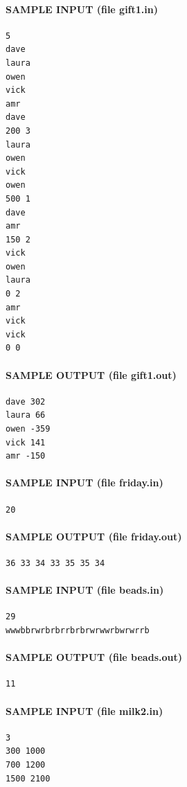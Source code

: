 \documentclass[11pt]{article}
\begin{document}
\paragraph{SAMPLE INPUT (file gift1.in)}
\begin{verbatim}
5
dave
laura
owen
vick
amr
dave
200 3
laura
owen
vick
owen
500 1
dave
amr
150 2
vick
owen
laura
0 2
amr
vick
vick
0 0
\end{verbatim}

\paragraph{SAMPLE OUTPUT (file gift1.out)}
\begin{verbatim}
dave 302
laura 66
owen -359
vick 141
amr -150
\end{verbatim}

\paragraph{SAMPLE INPUT (file friday.in)}
\begin{verbatim}
20
\end{verbatim}

\paragraph{SAMPLE OUTPUT (file friday.out)}
\begin{verbatim}
36 33 34 33 35 35 34
\end{verbatim}

\paragraph{SAMPLE INPUT (file beads.in)}
\begin{verbatim}
29
wwwbbrwrbrbrrbrbrwrwwrbwrwrrb
\end{verbatim}

\paragraph{SAMPLE OUTPUT (file beads.out)}
\begin{verbatim}
11
\end{verbatim}

\paragraph{SAMPLE INPUT (file milk2.in)}
\begin{verbatim}
3
300 1000
700 1200
1500 2100
\end{verbatim}
\end{document}
